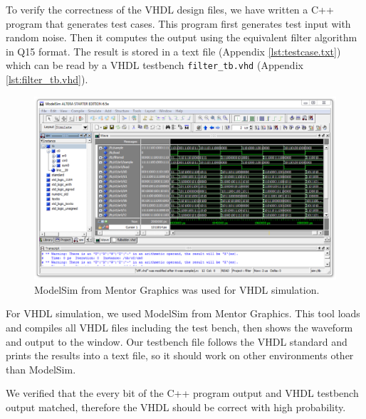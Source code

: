 To verify the correctness of the VHDL design files, we have written a C++ program that generates test cases. This program first generates test input with random noise. Then it computes the output using the equivalent filter algorithm in Q15 format. The result is stored in a text file (Appendix \ref{lst:testcase.txt}) which can be read by a VHDL testbench \texttt{filter\_tb.vhd} (Appendix \ref{lst:filter_tb.vhd}).

\begin{figure}[htbp]
	\centering
	\includegraphics[width=6.5in]{images/modelsim}
	\caption{ModelSim from Mentor Graphics was used for VHDL simulation.}
	\label{fig:q7}
\end{figure}

For VHDL simulation, we used ModelSim from Mentor Graphics. This tool loads and compiles all VHDL files including the test bench, then shows the waveform and output to the window. Our testbench file follows the VHDL standard and prints the results into a text file, so it should work on other environments other than ModelSim.

We verified that the every bit of the C++ program output and VHDL testbench output matched, therefore the VHDL should be correct with high probability.
